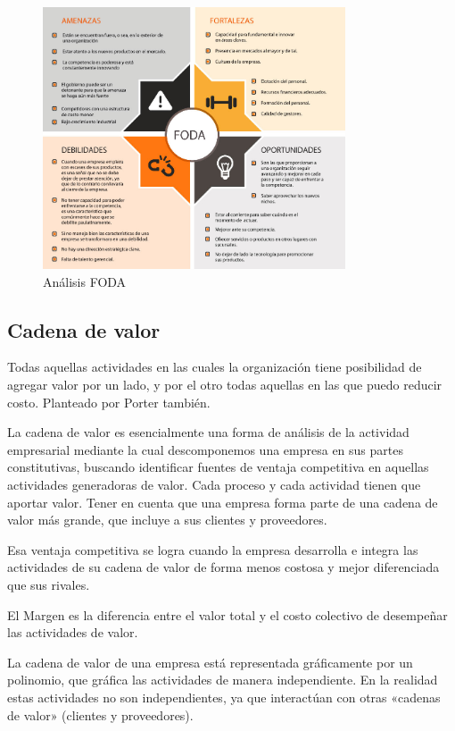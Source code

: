 \documentclass[titlepage,a4paper]{article}
\begin{document}
\begin{figure}[!htb]
    \centering
    \includegraphics[width=0.8\textwidth]{imagenes/Analisis-Foda.jpg}
    \caption{Análisis FODA}
\end{figure}

\newpage 

\subsection{Cadena de valor}
Todas aquellas actividades en las cuales la organización tiene posibilidad de agregar valor por un lado, y por el otro todas aquellas en las que puedo reducir costo. Planteado por Porter también.

La cadena de valor es esencialmente una forma de análisis de la actividad empresarial mediante la cual descomponemos una empresa en sus partes constitutivas, buscando identificar fuentes de ventaja competitiva en aquellas actividades generadoras de valor. Cada proceso y cada actividad tienen que aportar valor. Tener en cuenta que una empresa forma parte de una cadena de valor más grande, que incluye a sus clientes y proveedores. 
 
Esa ventaja competitiva se logra cuando la empresa desarrolla e integra las actividades de su cadena de valor de forma menos costosa y mejor diferenciada que sus rivales. 

El Margen es la diferencia entre el valor total y el costo colectivo de desempeñar las actividades de valor.

La cadena de valor de una empresa está representada gráficamente por un polinomio, que gráfica las actividades de manera independiente. En la realidad estas actividades no son independientes, ya que interactúan con otras «cadenas de valor» (clientes y proveedores). 
\end{document}
